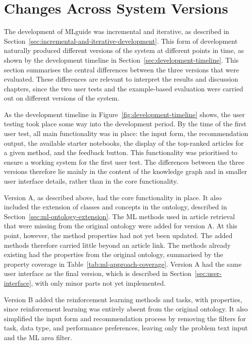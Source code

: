\section{Changes Across System Versions}
\label{sec:changes-across-system-versions}

The development of MLguide was incremental and iterative, as
described in Section~\ref{sec:incremental-and-iterative-development}.
This form of development
naturally produced different versions of the system at different
points in time, as shown by the development timeline in Section~\ref{sec:development-timeline}. 
This section summarises the central differences
between the three versions that were evaluated. These differences
are relevant to interpret the results and discussion chapters, since
the two user tests and the example-based evaluation were carried
out on different versions of the system.

As the development timeline in
Figure~\ref{fig:development-timeline} shows, the user testing took
place some way into the development period. By the time of the
first user test, all main functionality was in place: the input
form, the recommendation output, the available starter notebooks, 
the display of the top-ranked articles for a given
method, and the feedback button. This functionality was prioritised 
to ensure a working system for the first user test.
The differences between the
three versions therefore lie mainly in the content of the
knowledge graph and in smaller user interface details, rather than
in the core functionality.

Version A, as described above, had the core functionality in place. 
It also included the extension of classes and concepts in the
ontology, described in Section~\ref{sec:ml-ontology-extension}. 
The ML methods used in article retrieval that were missing from the
original ontology were added for version A. At this point, however,
the method properties had not yet been updated. The added methods
therefore carried little beyond an article link. 
The methods already existing
had the properties from the original ontology, summarised by the property coverage in
Table~\ref{tab:ml-approach-coverage}.
Version A had the same user interface as the final
version, which is described in Section~\ref{sec:user-interface}, with only
minor parts not yet implemented.

Version B added the reinforcement learning methods and tasks, with properties, 
since reinforcement learning was entirely absent from the original ontology. 
It also simplified the input form and recommendation process
by removing the filters for task, data type, and performance preferences, leaving
only the problem text input and the ML area filter. 

